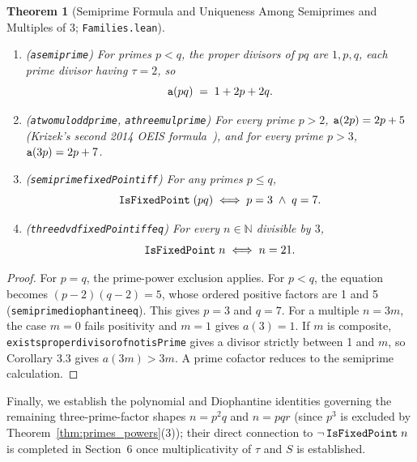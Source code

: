 \documentclass[11pt,reqno]{amsart}
\theoremstyle{plain}
\newtheorem{theorem}{Theorem}[section]
\theoremstyle{definition}
\theoremstyle{remark}
\newcommand{\leanid}[1]{\texttt{\upshape\def\_{\char95\relax}#1}}
\newcommand{\N}{\mathbb{N}}
\begin{document}
\begin{theorem}[Semiprime Formula and Uniqueness Among Semiprimes and Multiples of $3$; \leanid{Families.lean}]
\label{thm:semiprime_mult3}
\leavevmode
\begin{enumerate}
  \item (\leanid{a\_\allowbreak semiprime}) For primes $p < q$, the proper divisors of $p q$ are $1, p, q$, each prime divisor having $\tau = 2$, so
  \[
    \leanid{a}(p q) \;=\; 1 + 2p + 2q.
  \]
  \item (\leanid{a\_\allowbreak two\_\allowbreak mul\_\allowbreak odd\_\allowbreak prime}, \leanid{a\_\allowbreak three\_\allowbreak mul\_\allowbreak prime}) For every prime $p > 2$, $\leanid{a}(2p) = 2p + 5$ (Krizek's second 2014 OEIS formula~\cite{OEIS-A245211}), and for every prime $p > 3$, $\leanid{a}(3p) = 2p + 7$.
  \item (\leanid{semiprime\_\allowbreak fixedPoint\_\allowbreak iff}) For any primes $p \le q$,
  \[
    \leanid{IsFixedPoint}\;(p q) \;\Longleftrightarrow\; p = 3 \;\land\; q = 7.
  \]
  \item (\leanid{three\_\allowbreak dvd\_\allowbreak fixedPoint\_\allowbreak iff\_\allowbreak eq\_\allowbreak 21}) For every $n \in \N$ divisible by $3$,
  \[
    \leanid{IsFixedPoint}\;n \;\Longleftrightarrow\; n = 21.
  \]
\end{enumerate}
\end{theorem}

\begin{proof}
For $p=q$, the prime-power exclusion applies. For $p<q$, the equation becomes $(p-2)(q-2)=5$, whose ordered positive factors are 1 and 5 (\leanid{semiprime\_\allowbreak diophantine\_\allowbreak eq}). This gives $p=3$ and $q=7$. For a multiple $n=3m$, the case $m=0$ fails positivity and $m=1$ gives $a(3)=1$. If $m$ is composite, \leanid{exists\_\allowbreak proper\_\allowbreak divisor\_\allowbreak of\_\allowbreak not\_\allowbreak isPrime} gives a divisor strictly between 1 and $m$, so Corollary 3.3 gives $a(3m)>3m$. A prime cofactor reduces to the semiprime calculation.
\end{proof}

Finally, we establish the polynomial and Diophantine identities governing the remaining three-prime-factor shapes $n = p^2 q$ and $n = p q r$ (since $p^3$ is excluded by Theorem~\ref{thm:primes_powers}(3)); their direct connection to $\neg\,\leanid{IsFixedPoint}\;n$ is completed in Section~6 once multiplicativity of $\tau$ and $S$ is established.
\end{document}
